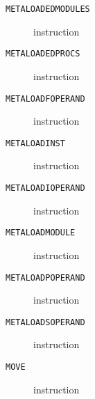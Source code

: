 \clearpage
\begin{description}
\item[\texttt{METALOADEDMODULES}] instruction\\

\end{description}
\clearpage
\begin{description}
\item[\texttt{METALOADEDPROCS}] instruction\\

\end{description}
\clearpage
\begin{description}
\item[\texttt{METALOADFOPERAND}] instruction\\

\end{description}
\clearpage
\begin{description}
\item[\texttt{METALOADINST}] instruction\\

\end{description}
\clearpage
\begin{description}
\item[\texttt{METALOADIOPERAND}] instruction\\

\end{description}
\clearpage
\begin{description}
\item[\texttt{METALOADMODULE}] instruction\\

\end{description}
\clearpage
\begin{description}
\item[\texttt{METALOADPOPERAND}] instruction\\

\end{description}
\clearpage
\begin{description}
\item[\texttt{METALOADSOPERAND}] instruction\\

\end{description}
\clearpage
\begin{description}
\item[\texttt{MOVE}] instruction\\

\end{description}
